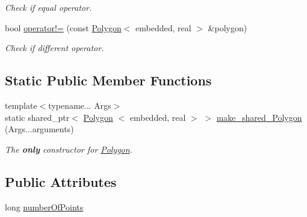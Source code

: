 \begin{DoxyCompactItemize}
\begin{DoxyCompactList}\small\item\em \-Check if equal operator. \end{DoxyCompactList}\item 
\hypertarget{class_polygon_abf1bf0edcebc33c975d81a704904ae0e}{bool \hyperlink{class_polygon_abf1bf0edcebc33c975d81a704904ae0e}{operator!=} (const \hyperlink{class_polygon}{\-Polygon}$<$ embedded, real $>$ \&polygon)}\label{class_polygon_abf1bf0edcebc33c975d81a704904ae0e}

\begin{DoxyCompactList}\small\item\em \-Check if different operator. \end{DoxyCompactList}\end{DoxyCompactItemize}
\subsection*{\-Static \-Public \-Member \-Functions}
\begin{DoxyCompactItemize}
\item 
{\footnotesize template$<$typename... \-Args$>$ }\\static shared\-\_\-ptr$<$ \hyperlink{class_polygon}{\-Polygon}\*
$<$ embedded, real $>$ $>$ \hyperlink{class_polygon_a2eb322f57f8043dfb195f3514b8b11e7}{make\-\_\-shared\-\_\-\-Polygon} (\-Args...\-arguments)
\begin{DoxyCompactList}\small\item\em \-The {\bfseries only} constructor for \hyperlink{class_polygon}{\-Polygon}. \end{DoxyCompactList}\end{DoxyCompactItemize}
\subsection*{\-Public \-Attributes}
\begin{DoxyCompactItemize}
\item 
long \hyperlink{class_polygon_a84d5ff2931fc01477beb2acc4c7448fb}{number\-Of\-Points}
\end{DoxyCompactItemize}
